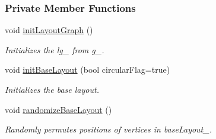 \subsubsection*{Private Member Functions}
\begin{DoxyCompactItemize}
\item 
void \hyperlink{structslb_1_1core_1_1ui_1_1StateGraph_a7d18a5ed30ef2371a3b1a29e76fa4791}{init\+Layout\+Graph} ()\hypertarget{structslb_1_1core_1_1ui_1_1StateGraph_a7d18a5ed30ef2371a3b1a29e76fa4791}{}\label{structslb_1_1core_1_1ui_1_1StateGraph_a7d18a5ed30ef2371a3b1a29e76fa4791}

\begin{DoxyCompactList}\small\item\em Initializes the {\ttfamily lg\+\_\+} from {\ttfamily g\+\_\+}. \end{DoxyCompactList}\item 
void \hyperlink{structslb_1_1core_1_1ui_1_1StateGraph_af1bf9b6a8961273f8d5a74591bdb1dd8}{init\+Base\+Layout} (bool circular\+Flag=true)
\begin{DoxyCompactList}\small\item\em Initializes the base layout. \end{DoxyCompactList}\item 
void \hyperlink{structslb_1_1core_1_1ui_1_1StateGraph_a47d88e0edf2f46fe4a66341d47220689}{randomize\+Base\+Layout} ()\hypertarget{structslb_1_1core_1_1ui_1_1StateGraph_a47d88e0edf2f46fe4a66341d47220689}{}\label{structslb_1_1core_1_1ui_1_1StateGraph_a47d88e0edf2f46fe4a66341d47220689}

\begin{DoxyCompactList}\small\item\em Randomly permutes positions of vertices in {\ttfamily base\+Layout\+\_\+}. \end{DoxyCompactList}\end{DoxyCompactItemize}
